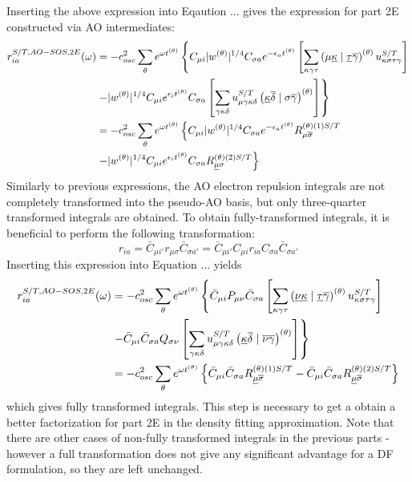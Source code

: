 Inserting the above expression into Eqaution ... gives the expression for part 2E constructed via AO intermediates:
\begin{equation}
\begin{split}
r_{ia}^{S/T,AO-SOS,2E}(\omega) &= - c_{osc}^2 \sum_{\theta} e^{\omega t^{(\theta)}} \left\lbrace C_{\mu i} |w^{(\theta)}|^{1/4} C_{\sigma a} e^{-\epsilon_a t^{(\theta)}} \left[ \sum_{\kappa\gamma\tau} \left( \mu\underline{\kappa} \mid \underline{\tau}\overline{\gamma} \right)^{(\theta)} u_{\kappa\sigma\tau\gamma}^{S/T} \right] \right. \\
& \left. - |w^{(\theta)}|^{1/4} C_{\mu i} e^{\epsilon_i t^{(\theta)}} C_{\sigma a} \left[\sum_{\gamma\kappa\delta} u_{\mu\gamma\kappa\delta}^{S/T} \left( \underline{\kappa}\overline{\delta} \mid \sigma\overline{\gamma} \right)^{(\theta)} \right] \right\rbrace \\
&= - c_{osc}^2 \sum_{\theta} e^{\omega t^{(\theta)}} \left\lbrace C_{\mu i} |w^{(\theta)}|^{1/4} C_{\sigma a} e^{-\epsilon_a t^{(\theta)}} R^{(\theta)(1)S/T}_{\mu\overline{\sigma}} \right. \\
& \left. - |w^{(\theta)}|^{1/4} C_{\mu i} e^{\epsilon_i t^{(\theta)}} C_{\sigma a} R^{(\theta)(2)S/T}_{\underline{\mu}\sigma} \right\rbrace
\end{split}
\end{equation}
\noindent Similarly to previous expressions, the AO electron repulsion integrals are not completely transformed into the pseudo-AO basis, but only three-quarter transformed integrals are obtained. To obtain fully-transformed integrals, it is beneficial to perform the following transformation:
\begin{equation}
r_{ia} =  \bar{C}_{\mu i'} r_{\mu \sigma} \bar{C}_{\sigma a'} = \bar{C}_{\mu i'} C_{\mu i} r_{ia} C_{\sigma a} \bar{C}_{\sigma a'}
\end{equation} 
\noindent Inserting this expression into Equation ... yields
\begin{equation}
\begin{split}
r_{ia}^{S/T,AO-SOS,2E}(\omega) &= - c_{osc}^2 \sum_{\theta} e^{\omega t^{(\theta)}} \left\lbrace \bar{C}_{\mu i} P_{\mu \nu} \bar{C}_{\sigma a} \left[ \sum_{\kappa\gamma\tau} \left( \underline{\nu}\underline{\kappa} \mid \underline{\tau}\overline{\gamma} \right)^{(\theta)} u_{\kappa\sigma\tau\gamma}^{S/T} \right] \right. \\
& \left. - \bar{C}_{\mu i} \bar{C}_{\sigma a} Q_{\sigma\nu} \left[\sum_{\gamma\kappa\delta} u_{\mu\gamma\kappa\delta}^{S/T} \left( \underline{\kappa}\overline{\delta} \mid \overline{\nu}\overline{\gamma} \right)^{(\theta)} \right] \right\rbrace \\
&= - c_{osc}^2 \sum_{\theta} e^{\omega t^{(\theta)}} \left\lbrace \bar{C}_{\mu i} \bar{C}_{\sigma a} R^{(\theta)(1)S/T}_{\underline{\mu}\overline{\sigma}} - \bar{C}_{\mu i} \bar{C}_{\sigma a} R^{(\theta)(2)S/T}_{\underline{\mu}\overline{\sigma}} \right\rbrace 
\end{split}
\end{equation} 
\noindent which gives fully transformed integrals. This step is necessary to get a obtain a better factorization for part 2E in the density fitting approximation. Note that there are other cases of non-fully transformed integrals in the previous parts - however a full transformation does not give any significant advantage for a DF formulation, so they are left unchanged.  

